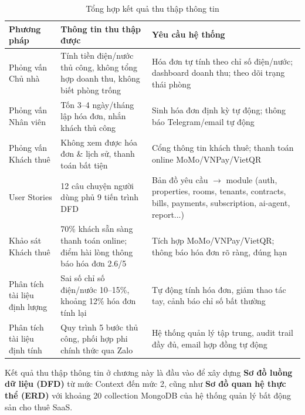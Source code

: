 \documentclass[12pt,a4paper]{report}
\begin{document}
\begin{table}[H]
  \centering
  \caption{Tổng hợp kết quả thu thập thông tin}
  \label{tab:ig_summary}
  \begin{tabular}{@{}p{3.4cm}p{5.4cm}p{5.2cm}@{}}
    \toprule
    \textbf{Phương pháp} & \textbf{Thông tin thu thập được} & \textbf{Yêu cầu hệ thống} \\
    \midrule
    Phỏng vấn Chủ nhà & Tính tiền điện/nước thủ công, không tổng hợp doanh thu, không biết phòng trống & Hóa đơn tự tính theo chỉ số điện/nước; dashboard doanh thu; theo dõi trạng thái phòng \\
    \addlinespace
    Phỏng vấn Nhân viên & Tốn 3--4 ngày/tháng lập hóa đơn, nhắn khách thủ công & Sinh hóa đơn định kỳ tự động; thông báo Telegram/email tự động \\
    \addlinespace
    Phỏng vấn Khách thuê & Không xem được hóa đơn \& lịch sử, thanh toán bất tiện & Cổng thông tin khách thuê; thanh toán online MoMo/VNPay/VietQR \\
    \addlinespace
    User Stories & 12 câu chuyện người dùng phủ 9 tiến trình DFD & Bản đồ yêu cầu $\rightarrow$ module (auth, properties, rooms, tenants, contracts, bills, payments, subscription, ai-agent, report...) \\
    \addlinespace
    Khảo sát Khách thuê & 70\% khách sẵn sàng thanh toán online; điểm hài lòng thông báo hóa đơn 2.6/5 & Tích hợp MoMo/VNPay/VietQR; thông báo hóa đơn rõ ràng, đúng hạn \\
    \addlinespace
    Phân tích tài liệu định lượng & Sai số chỉ số điện/nước 10--15\%, khoảng 12\% hóa đơn tính lại & Tự động tính hóa đơn, giảm thao tác tay, cảnh báo chỉ số bất thường \\
    \addlinespace
    Phân tích tài liệu định tính & Quy trình 5 bước thủ công, phối hợp phi chính thức qua Zalo & Hệ thống quản lý tập trung, audit trail đầy đủ, email hợp đồng tự động \\
    \bottomrule
  \end{tabular}
\end{table}

Kết quả thu thập thông tin ở chương này là đầu vào để xây dựng \textbf{Sơ đồ luồng dữ liệu (DFD)} từ mức Context đến mức 2, cũng như \textbf{Sơ đồ quan hệ thực thể (ERD)} với khoảng 20 collection MongoDB của hệ thống quản lý bất động sản cho thuê SaaS.
\end{document}
